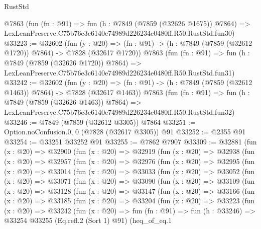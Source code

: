 \begin{lexlean}{RustStd}
\begin{coremodule}
    @7863
    (fun (fn : @91) =>
    fun (h : @7849 (@7859 (@32626 @1675)) @7864) =>
    LexLeanPreserve.C75b76e3c6140e74989d226234e0480ff.R50.RustStd.fun30)
@33223 := @32602
    (fun (y : @20) =>
    (fn : @91) -> (h : @7849 (@7859 (@32612 @1720)) @7864) -> @7828 (@32617 @1720))
    @7863
    (fun (fn : @91) =>
    fun (h : @7849 (@7859 (@32626 @1720)) @7864) =>
    LexLeanPreserve.C75b76e3c6140e74989d226234e0480ff.R50.RustStd.fun31)
@33242 := @32602
    (fun (y : @20) =>
    (fn : @91) -> (h : @7849 (@7859 (@32612 @1463)) @7864) -> @7828 (@32617 @1463))
    @7863
    (fun (fn : @91) =>
    fun (h : @7849 (@7859 (@32626 @1463)) @7864) =>
    LexLeanPreserve.C75b76e3c6140e74989d226234e0480ff.R50.RustStd.fun32)
@33246 := @7849 (@7859 (@32612 @3305)) @7864
@33251 := Option.noConfusion.{0, 0} (@7828 (@32617 @3305)) @91
@33252 := @2355 @91
@33254 := @33251 @33252 @91
@33255 := @7862 @7907
@33309 := @32881
    (fun (x : @20) =>
    @32900
      (fun (x : @20) =>
      @32919
        (fun (x : @20) =>
        @32938
          (fun (x : @20) =>
          @32957
            (fun (x : @20) =>
            @32976
              (fun (x : @20) =>
              @32995
                (fun (x : @20) =>
                @33014
                  (fun (x : @20) =>
                  @33033
                    (fun (x : @20) =>
                    @33052
                      (fun (x : @20) =>
                      @33071
                        (fun (x : @20) =>
                        @33090
                          (fun (x : @20) =>
                          @33109
                            (fun (x : @20) =>
                            @33128
                              (fun (x : @20) =>
                              @33147
                                (fun (x : @20) =>
                                @33166
                                  (fun (x : @20) =>
                                  @33185
                                    (fun (x : @20) =>
                                    @33204
                                      (fun (x : @20) =>
                                      @33223
                                        (fun (x : @20) =>
                                        @33242
                                          (fun (x : @20) =>
                                          fun (fn : @91) =>
                                          fun (h : @33246) =>
                                          @33254
                                            @33255
                                            (Eq.refl.{2} (Sort 1) @91)
                                            (heq_of_eq.{1}

\end{coremodule}
\end{lexlean}
